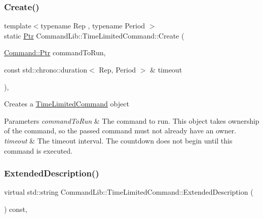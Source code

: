 \subsubsection{\texorpdfstring{Create()}{Create()}\hspace{0.1cm}{\footnotesize\ttfamily [2/2]}}
{\footnotesize\ttfamily template$<$typename Rep , typename Period $>$ \\
static \mbox{\hyperlink{class_command_lib_1_1_command_a3b3e4f00144373299df5c6bb1acc319d}{Ptr}} Command\+Lib\+::\+Time\+Limited\+Command\+::\+Create (\begin{DoxyParamCaption}\item[{\mbox{\hyperlink{class_command_lib_1_1_command_a3b3e4f00144373299df5c6bb1acc319d}{Command\+::\+Ptr}}}]{command\+To\+Run,  }\item[{const std\+::chrono\+::duration$<$ Rep, Period $>$ \&}]{timeout }\end{DoxyParamCaption})\hspace{0.3cm}{\ttfamily [inline]}, {\ttfamily [static]}}



Creates a \mbox{\hyperlink{class_command_lib_1_1_time_limited_command}{Time\+Limited\+Command}} object 


\begin{DoxyParams}{Parameters}
{\em command\+To\+Run} & The command to run. This object takes ownership of the command, so the passed command must not already have an owner. \\
\hline
{\em timeout} & The timeout interval. The countdown does not begin until this command is executed. \\
\hline
\end{DoxyParams}
\mbox{\label{class_command_lib_1_1_time_limited_command_aaf7018c66b91a5d1a519325b99dc3f55}} 
\subsubsection{\texorpdfstring{Extended\+Description()}{ExtendedDescription()}}
{\footnotesize\ttfamily virtual std\+::string Command\+Lib\+::\+Time\+Limited\+Command\+::\+Extended\+Description (\begin{DoxyParamCaption}{ }\end{DoxyParamCaption}) const\hspace{0.3cm}{\ttfamily [override]}, {\ttfamily [virtual]}}



